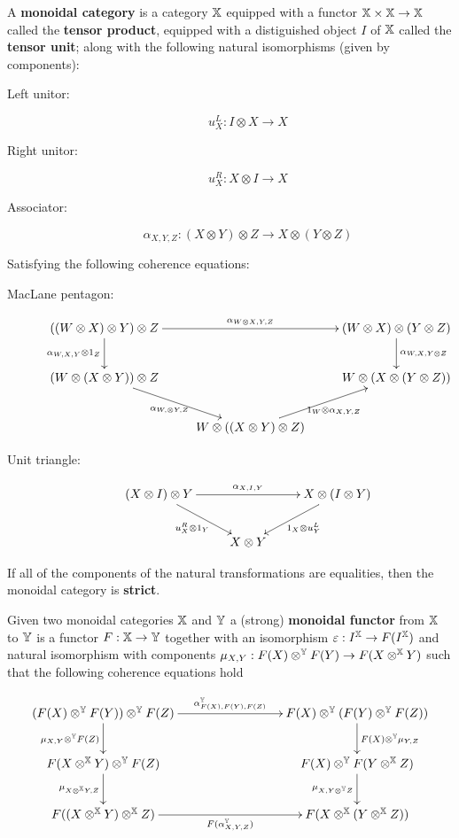 \begin{definition}
A {\bf monoidal category} is a category $\mathbb{X}$ equipped with a functor $\mathbb{X}\times\mathbb{X}\to \mathbb{X}$ called the {\bf tensor product}, equipped with a distiguished object $I$ of $\mathbb{X}$ called the {\bf tensor unit}; along with the following natural isomorphisms (given by components):

\begin{description}
\item[Left unitor:]
$$
u_X^L:I\otimes X \to X
$$
\item[Right unitor:]
$$
u_X^R: X\otimes I \to X
$$
\item[Associator:]
$$
\alpha_{X,Y,Z}:(X\otimes Y)\otimes Z \to X\otimes(Y\otimes Z)
$$
\end{description}

Satisfying the following coherence equations:

\begin{description}
\item[MacLane pentagon:]


$$
\xymatrix{
  ((W\otimes X )\otimes Y)\otimes Z \ar[rr]^{\alpha_{W\otimes X,Y,Z}} \ar[d]_{\alpha_{W,X,Y}\otimes 1_Z}
    &
    & (W\otimes X )\otimes (Y\otimes Z) \ar[d]^{\alpha_{W, X,Y\otimes Z}}
  \\  (W\otimes(X\otimes Y))\otimes Z \ar[dr]_{\alpha_{W,\otimes Y,Z}}
    & 
    & W\otimes (X\otimes(Y\otimes Z)) 
  \\&
    W\otimes ((X\otimes Y)\otimes Z) \ar[ur]_{1_W\otimes \alpha_{X,Y,Z}}
}
$$

\item[Unit triangle:]

$$
\xymatrix{
  (X\otimes I)\otimes Y \ar[rr]^{\alpha_{X,I,Y}} \ar[dr]_{u_X^{R}\otimes 1_Y}
    &
    & X\otimes (I\otimes Y) \ar[dl]^{1_X\otimes u_Y^{L}}\\
  & X\otimes Y
}
$$

\end{description}

If all of the components of the natural transformations are equalities, then the monoidal category is {\bf strict}.

Given two monoidal categories $\mathbb{X}$ and $\mathbb{Y}$ a (strong) {\bf monoidal functor} from $\mathbb{X}$ to $\mathbb{Y}$ is a functor $F:\mathbb{X}\to \mathbb{Y}$ together with an isomorphism $\varepsilon:I^{\mathbb{X}} \to F(I^{\mathbb{X}})$ and natural isomorphism with components $\mu_{X,Y}:F(X)\otimes^{\mathbb{Y}} F(Y) \to F(X \otimes^{\mathbb{X}} Y)$ such that the following coherence equations hold


$$
\xymatrix{
 (F(X)\otimes^\Y F(Y))\otimes^\Y F(Z) \ar[rrr]^{\alpha_{F(X),F(Y),F(Z)}^{\Y}} \ar[d]_{\mu_{X,Y}\otimes^\Y F(Z)}
   &&& F(X) \otimes^\Y (F(Y)\otimes^\Y F(Z)) \ar[d]^{F(X)\otimes^\Y \mu_{Y,Z}}
 \\F(X\otimes^\X Y)\otimes^\Y F(Z) \ar[d]_{\mu_{X\otimes^\X Y,Z}}
   &&& F(X)\otimes^\Y F(Y\otimes^\X Z) \ar[d]_{\mu_{X,Y\otimes^\Y Z}}
 \\ F((X\otimes^\X Y) \otimes^\X Z) \ar[rrr]_{F(\alpha_{X,Y,Z}^\Y)}
   &&& F(X\otimes^\X (Y\otimes^\X Z))
}
$$


\end{definition}
